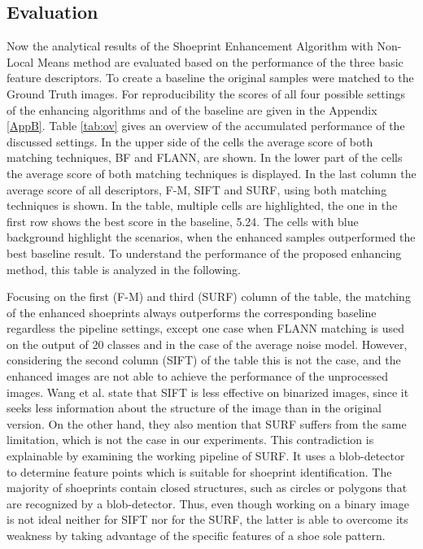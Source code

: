 \documentclass[draft,final]{vutinfth} %
\begin{document}
\subsection{Evaluation}

\par
Now the analytical results of the Shoeprint Enhancement Algorithm with Non-Local Means method are evaluated based on the performance of  the three basic feature descriptors.
To create a baseline the original samples were matched to the Ground Truth images.
For reproducibility the scores of all four possible settings  of the enhancing algorithms and of the baseline are given in the Appendix \ref{AppB}.
Table \ref{tab:ov} gives an overview of the accumulated performance of the discussed settings.
In the upper side of the cells the average score of both matching techniques, BF and FLANN, are shown.
In the lower part of the cells the average score of both matching techniques is displayed.
In the last column the average score of all descriptors, F-M, SIFT and SURF, using both matching techniques is shown.
In the table, multiple cells are highlighted, the one in the first row shows the best score in the baseline, 5.24.
The cells with blue background highlight the scenarios, when the enhanced samples outperformed the best baseline result.
To understand the performance of the proposed enhancing method, this table is analyzed in the following.
\par
Focusing on the first (F-M) and third (SURF) column of the table, the matching of the enhanced shoeprints always outperforms the corresponding baseline regardless the pipeline settings, except one case when FLANN matching is used on the output of 20 classes and in the case of the average noise model.
However, considering the second column (SIFT) of the table this is not the case, and the enhanced images are not able to achieve the performance of the unprocessed images.
Wang et al. \cite{wang2017manifold} state that SIFT is less effective on binarized images, since it seeks less information about the structure of the image than in the original version.
On the other hand, they also mention that SURF suffers from the same limitation, which is not the case in our experiments.
This contradiction is explainable by examining the working pipeline of SURF.
It uses a blob-detector to determine feature points which is suitable for shoeprint identification.
The majority of shoeprints contain closed structures, such as circles or polygons that are recognized by a blob-detector.
Thus, even though working on a binary image is not ideal neither for SIFT nor for the SURF, the latter is able to overcome its weakness by taking advantage of the specific features of a shoe sole pattern. 
\end{document}
